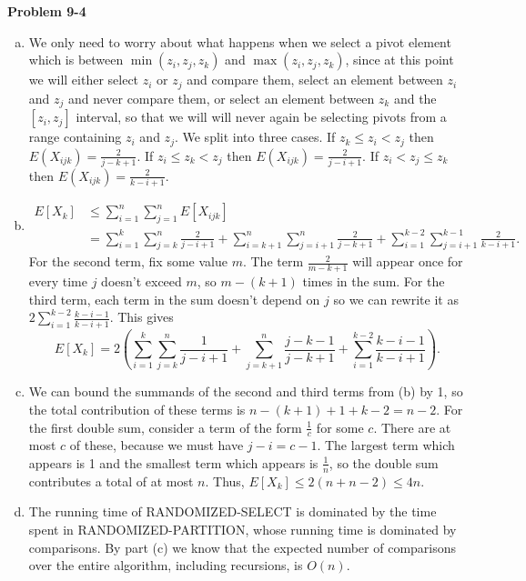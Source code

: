 \documentclass{article}
\begin{document}
\noindent\textbf{Problem 9-4}\\
\begin{enumerate}[a.]
\item  We only need to worry about what happens when we select a pivot element which is between $\min(z_i,z_j,z_k)$ and $\max(z_i,z_j,z_k)$, since at this point we will either select $z_i$ or $z_j$ and compare them, select an element between $z_i$ and $z_j$ and never compare them, or select an element between $z_k$ and the $[z_i,z_j]$ interval, so that we will will never again be selecting pivots from a range containing $z_i$ and $z_j$.  We split into three cases.  If $z_k \leq z_i < z_j$ then $E(X_{ijk})=  \frac{2}{j-k+1} $.  If $z_i \leq z_k < z_j$ then $E(X_{ijk})=  \frac{2}{j-i+1}$.  If $z_i < z_j \leq z_k$ then $E(X_{ijk})=  \frac{2}{k-i+1}$. 

\item
\begin{align*}
E[X_k] &\leq \sum_{i=1}^n \sum_{j=1}^n E[X_{ijk}] \\
&= \sum_{i=1}^k \sum_{j=k}^n \frac{2}{j-i+1} + \sum_{i=k+1}^n \sum_{j=i+1}^n \frac{2}{j-k+1} + \sum_{i=1}^{k-2}\sum_{j=i+1}^{k-1}\frac{2}{k-i+1}.
\end{align*}
For the second term, fix some value $m$.  The term $\frac{2}{m-k+1}$ will appear once for every time $j$ doesn't exceed $m$, so $m- (k+1)$ times in the sum.  For the third term, each term in the sum doesn't depend on $j$ so we can rewrite it as $2\sum_{i=1}^{k-2} \frac{k-i-1}{k-i+1}$.  This gives
\[ E[X_k] = 2\left(\sum_{i=1}^k \sum_{j=k}^n \frac{1}{j-i+1} + \sum_{j=k+1}^n \frac{j-k-1}{j-k+1} + \sum_{i=1}^{k-2} \frac{k-i-1}{k-i+1} \right).\]

\item  We can bound the summands of the second and third terms from (b) by 1, so the total contribution of these terms is $n-(k+1)+1 + k-2 = n-2$.  For the first double sum, consider a term of the form $\frac{1}{c}$ for some $c$.  There are at most $c$ of these, because we must have $j-i = c-1$.  The largest term which appears is 1 and the smallest term which appears is $\frac{1}{n}$, so the double sum contributes a total of at most $n$.  Thus, $E[X_k] \leq 2(n + n - 2) \leq 4n$.


\item The running time of RANDOMIZED-SELECT is dominated by the time spent in RANDOMIZED-PARTITION, whose running time is dominated by comparisons.  By part (c) we know that the expected number of comparisons over the entire algorithm, including recursions, is $O(n)$.

\end{enumerate}
\end{document}

